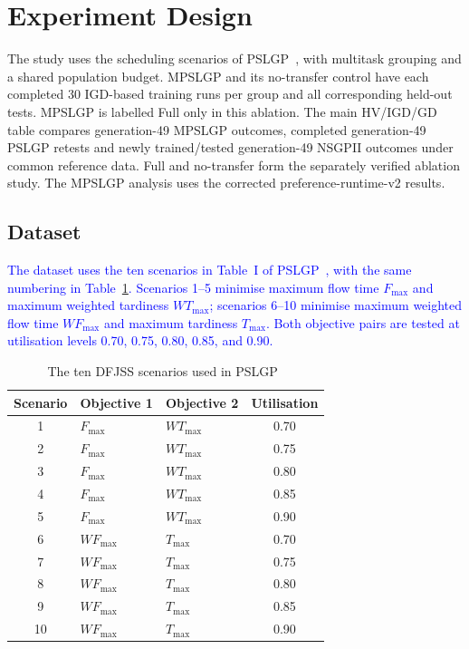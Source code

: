 \documentclass[10pt,journal]{IEEEtran}
\newcommand{\revision}[1]{\textcolor{blue}{#1}}
\newcommand{\resultrevision}[1]{\textcolor{resultrevision}{#1}}
\begin{document}
\section{Experiment Design}
\label{sec:experiment-design}
\resultrevision{The study uses the scheduling scenarios of PSLGP~\cite{xu2026pslgp}, with multitask grouping and a shared population budget. MPSLGP and its no-transfer control have each completed 30 IGD-based training runs per group and all corresponding held-out tests. MPSLGP is labelled Full only in this ablation. The main HV/IGD/GD table compares generation-49 MPSLGP outcomes, completed generation-49 PSLGP retests and newly trained/tested generation-49 NSGPII outcomes under common reference data. Full and no-transfer form the separately verified ablation study. The MPSLGP analysis uses the corrected preference-runtime-v2 results.}

\subsection{Dataset}
\revision{The dataset uses the ten scenarios in Table~I of PSLGP~\cite{xu2026pslgp}, with the same numbering in Table~\ref{tab:pslgp-scenarios}. Scenarios 1--5 minimise maximum flow time $F_{\max}$ and maximum weighted tardiness $WT_{\max}$; scenarios 6--10 minimise maximum weighted flow time $WF_{\max}$ and maximum tardiness $T_{\max}$. Both objective pairs are tested at utilisation levels 0.70, 0.75, 0.80, 0.85, and 0.90.}

\begin{table}[t]
\centering
\caption{The ten DFJSS scenarios used in PSLGP~\cite{xu2026pslgp}}
\label{tab:pslgp-scenarios}
\footnotesize
\begin{tabular}{cllc}
\toprule
Scenario & Objective 1 & Objective 2 & Utilisation \\
\midrule
1 & $F_{\max}$ & $WT_{\max}$ & 0.70 \\
2 & $F_{\max}$ & $WT_{\max}$ & 0.75 \\
3 & $F_{\max}$ & $WT_{\max}$ & 0.80 \\
4 & $F_{\max}$ & $WT_{\max}$ & 0.85 \\
5 & $F_{\max}$ & $WT_{\max}$ & 0.90 \\
\midrule
6 & $WF_{\max}$ & $T_{\max}$ & 0.70 \\
7 & $WF_{\max}$ & $T_{\max}$ & 0.75 \\
8 & $WF_{\max}$ & $T_{\max}$ & 0.80 \\
9 & $WF_{\max}$ & $T_{\max}$ & 0.85 \\
10 & $WF_{\max}$ & $T_{\max}$ & 0.90 \\
\bottomrule
\end{tabular}
\end{table}
\end{document}
